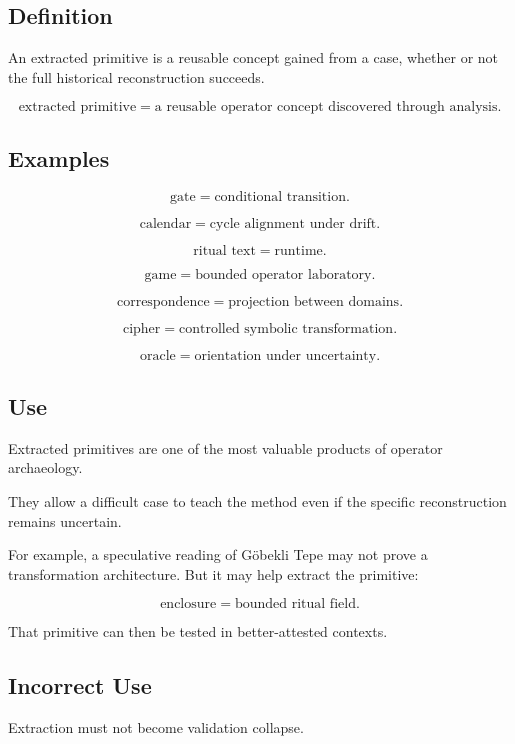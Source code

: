 \documentclass[11pt]{book}
\begin{document}
\subsection{Definition}

An extracted primitive is a reusable concept gained from a case, whether or not the full historical reconstruction succeeds.

\[
\text{extracted primitive} = \text{a reusable operator concept discovered through analysis}.
\]

\subsection{Examples}

\[
\text{gate} = \text{conditional transition}.
\]

\[
\text{calendar} = \text{cycle alignment under drift}.
\]

\[
\text{ritual text} = \text{runtime}.
\]

\[
\text{game} = \text{bounded operator laboratory}.
\]

\[
\text{correspondence} = \text{projection between domains}.
\]

\[
\text{cipher} = \text{controlled symbolic transformation}.
\]

\[
\text{oracle} = \text{orientation under uncertainty}.
\]

\subsection{Use}

Extracted primitives are one of the most valuable products of operator archaeology.

They allow a difficult case to teach the method even if the specific reconstruction remains uncertain.

For example, a speculative reading of Göbekli Tepe may not prove a transformation architecture. But it may help extract the primitive:

\[
\text{enclosure} = \text{bounded ritual field}.
\]

That primitive can then be tested in better-attested contexts.

\subsection{Incorrect Use}

Extraction must not become validation collapse.
\end{document}
